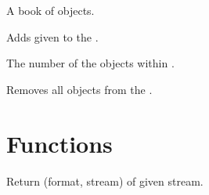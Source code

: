 \documentclass[a4paper,12pt,english]{sphinxmanual}
\begin{document}
\begin{fulllineitems}
\label{api:tablib.Databook}
A book of {\hyperref[api:tablib.Dataset]{}} objects.

\begin{fulllineitems}
\label{api:tablib.Databook.add_sheet}
Adds given {\hyperref[api:tablib.Dataset]{}} to the {\hyperref[api:tablib.Databook]{}}.

\end{fulllineitems}


\begin{fulllineitems}
\label{api:tablib.Databook.size}
The number of the {\hyperref[api:tablib.Dataset]{}} objects within {\hyperref[api:tablib.Databook]{}}.

\end{fulllineitems}


\begin{fulllineitems}
\label{api:tablib.Databook.wipe}
Removes all {\hyperref[api:tablib.Dataset]{}} objects from the {\hyperref[api:tablib.Databook]{}}.

\end{fulllineitems}


\end{fulllineitems}



\section{Functions}
\label{api:functions}

\begin{fulllineitems}
\label{api:tablib.detect}
Return (format, stream) of given stream.

\end{fulllineitems}

\end{document}
